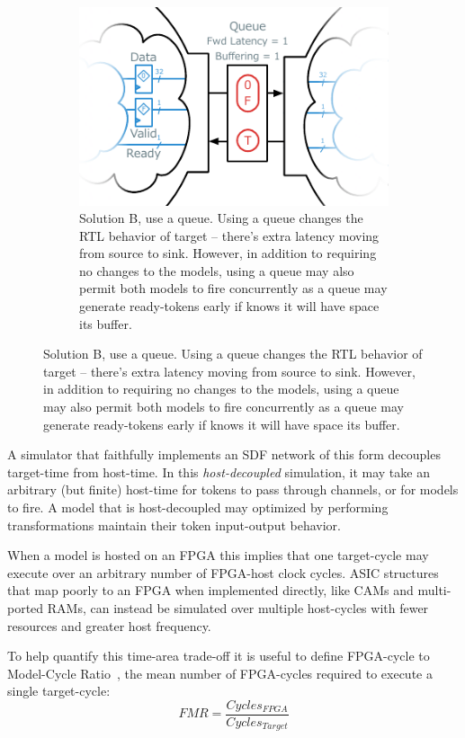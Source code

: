 \begin{figure}
\begin{subfigure}[t]{0.48\textwidth}
    \end{subfigure}\hspace{0.5cm}
    \begin{subfigure}[t]{0.48\textwidth}
        \includegraphics[width=\textwidth]{figures/queue-decoupled-example.pdf}
        \caption{Solution B, use a queue. Using a queue changes the RTL
        behavior of target -- there's extra latency moving from source to sink.
        However, in addition to requiring no changes to the models, using a queue may also
        permit both models to fire concurrently as a queue may generate
        ready-tokens early if knows it will have space its buffer.}
        \label{fig:queue-decoupled-example}
    \end{subfigure}
\end{figure}

A simulator that faithfully implements an SDF network of this form decouples
target-time from host-time. In this \emph{host-decoupled} simulation, it may
take an arbitrary (but finite) host-time for tokens to pass through channels,
or for models to fire. A model that is host-decoupled may optimized by
performing transformations maintain their token input-output behavior.

When a model is hosted on an FPGA this implies that one target-cycle may
execute over an arbitrary number of FPGA-host clock cycles.  ASIC structures
that map poorly to an FPGA when implemented directly, like CAMs and
multi-ported RAMs, can instead be simulated over multiple host-cycles with
fewer resources and greater host frequency.

To help quantify this time-area trade-off it is useful to define FPGA-cycle to
Model-Cycle Ratio~\cite{APorts}, the mean number of FPGA-cycles required to
execute a single target-cycle: $$ FMR = \frac{Cycles_{FPGA}}{Cycles_{Target}}
$$


